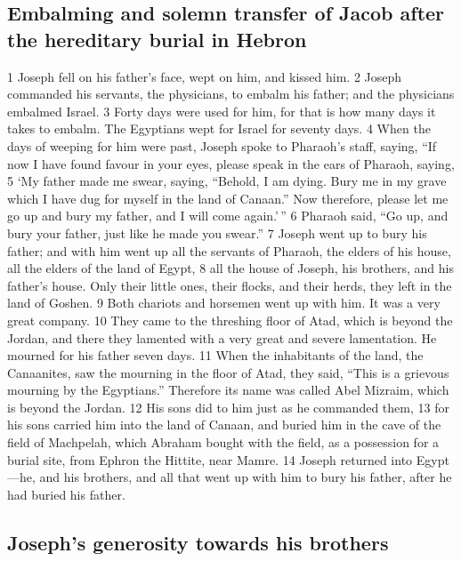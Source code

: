 \hypertarget{embalming-and-solemn-transfer-of-jacob-after-the-hereditary-burial-in-hebron}{%
\subsection{Embalming and solemn transfer of Jacob after the hereditary
burial in
Hebron}\label{embalming-and-solemn-transfer-of-jacob-after-the-hereditary-burial-in-hebron}}

{1} Joseph fell on his father's face, wept on him, and kissed him. {2}
Joseph commanded his servants, the physicians, to embalm his father; and
the physicians embalmed Israel. {3} Forty days were used for him, for
that is how many days it takes to embalm. The Egyptians wept for Israel
for seventy days. {4} When the days of weeping for him were past, Joseph
spoke to Pharaoh's staff, saying, ``If now I have found favour in your
eyes, please speak in the ears of Pharaoh, saying, {5} `My father made
me swear, saying, ``Behold, I am dying. Bury me in my grave which I have
dug for myself in the land of Canaan.'' Now therefore, please let me go
up and bury my father, and I will come again.'\,'' {6} Pharaoh said,
``Go up, and bury your father, just like he made you swear.'' {7} Joseph
went up to bury his father; and with him went up all the servants of
Pharaoh, the elders of his house, all the elders of the land of Egypt,
{8} all the house of Joseph, his brothers, and his father's house. Only
their little ones, their flocks, and their herds, they left in the land
of Goshen. {9} Both chariots and horsemen went up with him. It was a
very great company. {10} They came to the threshing floor of Atad, which
is beyond the Jordan, and there they lamented with a very great and
severe lamentation. He mourned for his father seven days. {11} When the
inhabitants of the land, the Canaanites, saw the mourning in the floor
of Atad, they said, ``This is a grievous mourning by the Egyptians.''
Therefore its name was called Abel Mizraim, which is beyond the Jordan.
{12} His sons did to him just as he commanded them, {13} for his sons
carried him into the land of Canaan, and buried him in the cave of the
field of Machpelah, which Abraham bought with the field, as a possession
for a burial site, from Ephron the Hittite, near Mamre. {14} Joseph
returned into Egypt---he, and his brothers, and all that went up with
him to bury his father, after he had buried his father.

\hypertarget{josephs-generosity-towards-his-brothers}{%
\subsection{Joseph's generosity towards his
brothers}\label{josephs-generosity-towards-his-brothers}}

